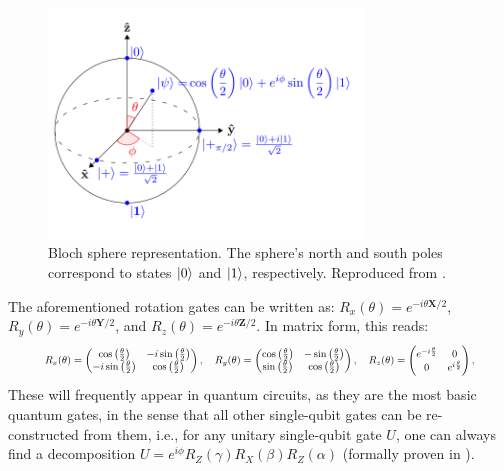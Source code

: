 \begin{figure}[H]
    \centering
    \includegraphics[width=0.75\textwidth]{Figures/Diagrams/Bloch_sphere.png}
    \caption{Bloch sphere representation. The sphere's north  and south poles correspond to states $\ket{0}$ and $\ket{1}$, respectively. Reproduced from \cite{Bloch_Sphere_Ref}.}
    \label{fig:Bloch_sphere}
\end{figure}
\noindent The aforementioned rotation gates can be written as: $R_x(\theta) = e^{-i\theta\boldsymbol{X}/2}$, $R_y(\theta) = e^{-i\theta\boldsymbol{Y}/2}$, and $R_z(\theta) = e^{-i\theta\boldsymbol{Z}/2}$. In matrix form, this reads:
\begin{equation}
  \resizebox{0.90\hsize}{!}
  {$
  R_x(\theta) =
  \begin{pmatrix}
    \cos\left(\frac{\theta}{2}\right) & -i\sin\left(\frac{\theta}{2}\right) \\
    -i\sin\left(\frac{\theta}{2}\right) & \cos\left(\frac{\theta}{2}\right)
  \end{pmatrix},
  \quad
  R_y(\theta) =
  \begin{pmatrix}
    \cos\left(\frac{\theta}{2}\right) & -\sin\left(\frac{\theta}{2}\right) \\
    \sin\left(\frac{\theta}{2}\right) & \cos\left(\frac{\theta}{2}\right)
  \end{pmatrix},
  \quad
  R_z(\theta) =
  \begin{pmatrix}
    e^{-i\frac{\theta}{2}} & 0 \\
    0 & e^{i\frac{\theta}{2}}
  \end{pmatrix},
  $}
\end{equation}
These will frequently appear in quantum circuits, as they are the most basic quantum gates, in the sense that all other single-qubit gates can be re-constructed from them, i.e., for any unitary single-qubit gate $U$, one can always find a decomposition $U=e^{i\phi}R_{Z}(\gamma)R_{X}(\beta)R_{Z}(\alpha)$ (formally proven in \cite{Barenco_1995}).

